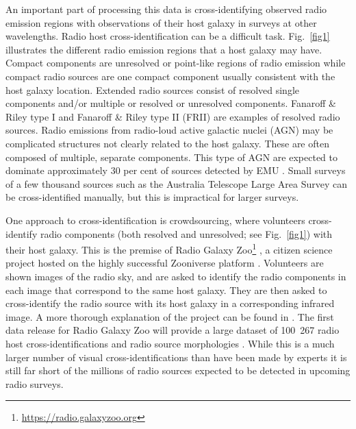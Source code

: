 \documentclass[fleqn,usenatbib,usedcolumn]{mnras}
\begin{document}
  An important part of processing this data is cross-identifying observed radio
  emission regions with observations of their host galaxy in surveys at other
  wavelengths. Radio host cross-identification can be a difficult task. Fig.~\ref{fig1} illustrates the different radio emission regions that a host galaxy may have. Compact components are unresolved or point-like regions of radio emission while compact radio sources are one compact component usually consistent with the host galaxy location. Extended radio sources consist of resolved single components and/or multiple or resolved or unresolved components. Fanaroff \& Riley type I \citep[FRI; ][]{Fanaroff1974} and Fanaroff \& Riley type II (FRII) are examples of resolved radio sources.
  Radio emissions from radio-loud active galactic nuclei (AGN) may be
  complicated structures not clearly related to the host galaxy. These are often
  composed of multiple, separate components. This type of AGN are expected to dominate
  approximately 30 per cent of sources detected by EMU \citep{norris11}. Small surveys
  of a few thousand sources such as the Australia Telescope Large Area Survey
  \citep[ATLAS;][]{norris06,middelberg08} can be cross-identified manually, but
  this is impractical for larger surveys.

  One approach to cross-identification is crowdsourcing, where volunteers cross-identify radio components (both resolved and unresolved; see Fig.~\ref{fig1}) with their host
  galaxy. This is the premise of Radio Galaxy Zoo\footnote{\url{https://radio.galaxyzoo.org}} \citep{banfield15},
  a citizen science project hosted on the highly successful Zooniverse platform
  \citep{lintott08}. Volunteers are shown images of the radio sky, and are asked
  to identify the radio components in each image that correspond to the same host galaxy. They are then asked to cross-identify the radio source with its host galaxy in a corresponding infrared image. A more thorough explanation of the project can be found in \citet{banfield15}. The first data release for Radio Galaxy Zoo will
  provide a large dataset of 100~267 radio host cross-identifications and radio
  source morphologies \citep{wong17}. While this is a much larger number of visual
  cross-identifications than have been made by experts \citep[i.e., ][]{Taylor2007,Gendre2008,Grant2010,norris06,middelberg08} it is still far short of
  the millions of radio sources expected to be detected in upcoming radio
  surveys.
\end{document}
